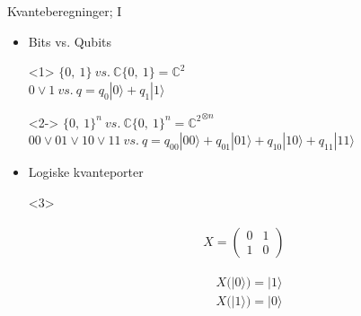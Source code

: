 \documentclass[norsk]{beamer}
\begin{document}
	\begin{frame}{Kvanteberegninger; I}
		\begin{itemize}
			\item Bits vs. Qubits \\
			\begin{onlyenv}<1>
				\begin{math}
					\{0,\ 1\}\ vs.\ \mathbb{C}\{0,\ 1\} = \mathbb{C}^2
				\end{math} \\
				\begin{math}
					0 \vee 1\ vs.\ q = q_0|0\rangle + q_1|1\rangle
				\end{math}
			\end{onlyenv}

			\begin{onlyenv}<2->
				\begin{math}
					\{0,\ 1\}^n\ vs.\ \mathbb{C}\{0,\ 1\}^n = {\mathbb{C}^2}^{\otimes n}
				\end{math} \\
				\begin{math}
					00 \vee 01 \vee 10 \vee 11\ vs.\ q = q_{00}|00\rangle + q_{01}|01\rangle + q_{10}|10\rangle + q_{11}|11\rangle
				\end{math}
			\end{onlyenv}

			\item Logiske kvanteporter \\
			\begin{onlyenv}<3>
				\begin{minipage}{0.25\textwidth}
					\begin{align*}
						X = \begin{pmatrix*}
							0 & 1 \\
							1 & 0
						\end{pmatrix*}
					\end{align*}
				\end{minipage}
				\begin{minipage}{0.25\textwidth}
					\begin{align*}
						& X(|0\rangle) = |1\rangle \\
						& X(|1\rangle) = |0\rangle
					\end{align*}
				\end{minipage}
			\end{onlyenv}


\end{itemize}
\end{frame}
\end{document}

